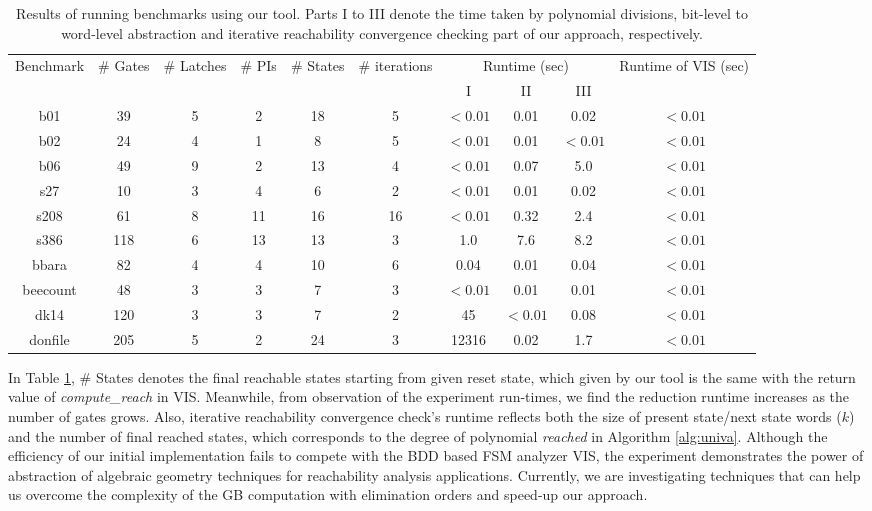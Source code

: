 \begin{table}[H]
\centering
\caption{Results of running benchmarks using our tool. 
\small{Parts I to III denote the time taken by polynomial divisions,
  bit-level to word-level abstraction and iterative reachability
  convergence checking part of our approach, respectively.}}
{\small 
\begin{tabular}{|c||c|c|c|c|c|c|c|c|c|}
\hline
\multirow{3}{*}{\centering Benchmark} 
& \multirow{3}{0.9cm}{\centering \# Gates} 
& \multirow{3}{1.1cm}{\centering \# Latches} 
& \multirow{3}{*}{\centering \# PIs}
 & \multirow{3}{0.9cm}{\centering \# States}
 & \multirow{3}{1.3cm}{\centering \# iterations}
 & \multicolumn{3}{c|}{\multirow{2}{2.0cm}{\centering Runtime (sec)}}
 & \multirow{3}{1.8cm}{\centering Runtime of VIS (sec)} \\
  & & & & & &\multicolumn{3}{c|}{}& \\
  \cline{7-9}
    & & & & & & I & II & III & \\
\hline
\hline
b01 & 39  & 5  & 2 & 18  & 5  & $<0.01$ & 0.01 & 0.02 & $<0.01$\\
b02 & 24  & 4  & 1 & 8 & 5 & $<0.01$  & 0.01 & $<0.01$ & $<0.01$ \\
b06 & 49  & 9  & 2 & 13 & 4 & $<0.01$ & 0.07 & 5.0 & $<0.01$ \\
s27 & 10 & 3 & 4 & 6 & 2 & $<0.01$ & 0.01 & 0.02  & $<0.01$  \\
s208 & 61 & 8 & 11 & 16 & 16 & $<0.01$ & 0.32 & 2.4 & $<0.01$ \\
s386 & 118 & 6 & 13 & 13  & 3 & 1.0 & 7.6 & 8.2  & $<0.01$ \\
bbara & 82 & 4 & 4 & 10 & 6 & 0.04 & 0.01 & 0.04  & $<0.01$ \\
beecount & 48  & 3  & 3 & 7  & 3  &$<0.01$ & 0.01 & 0.01 & $<0.01$ \\
dk14 & 120  & 3  & 3 & 7  & 2  & 45 & $<0.01$ & 0.08 & $<0.01$\\
donfile & 205  & 5  & 2 & 24 & 3  & 12316 & 0.02 & 1.7  & $<0.01$\\
\hline
\end{tabular}
}
\label{tab:recha_result}  
\end{table} 

In Table \ref{tab:recha_result}, \# States denotes the final reachable states
starting from given reset state, which given by our tool is the same with
the return value of {\it compute\_reach} in VIS. Meanwhile, from observation
of the experiment run-times, we find the reduction runtime increases
as the number of gates grows. Also, iterative reachability convergence
check's runtime reflects both the size of present state/next state
words ($k$) and the number of final reached states, which corresponds
to the degree of polynomial {\it reached} in Algorithm \ref{alg:univa}. 
Although the efficiency of our initial implementation fails to compete
with the BDD based FSM analyzer VIS, the experiment
demonstrates the power of abstraction of algebraic geometry techniques
for reachability analysis applications. Currently, we are
investigating techniques that
can help us overcome the complexity of the GB computation with elimination
orders and speed-up our approach. 

